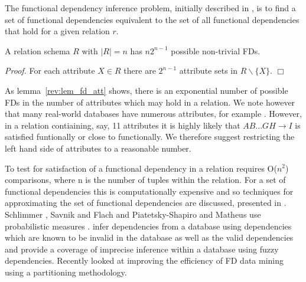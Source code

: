 The functional dependency inference problem,  initially described in
\cite{mr86}, is to find a set of functional dependencies equivalent to
the set of all functional dependencies that hold for a given relation
$r$.  

\begin{lemma}\label{rev:lem_fd_att}
\begin{rm}
A relation schema $R$ with $\mid R \mid = n$ has $n2^{n-1}$ possible
non-trivial FDs.
\end{rm}
\end{lemma}


{\em Proof.} For each attribute $X \in R$ there are $2^{n-1}$ attribute
sets in $R \backslash \{ X \}$. $\Box$

As lemma~\ref{rev:lem_fd_att} shows, there is an exponential number of
possible FDs in the number of attributes which may hold in a
relation. We note however that many real-world databases have numerous
attributes, for example \cite{bkm98}. However, in a relation
contiaining, say, 11 attributes it is highly likely that $AB \ldots GH
\to I$ is satisfied funtionally or close to functionally. We therefore
suggest restricting the left hand side of attributes to a reasonable number.

To test for satisfaction of a functional dependency in a
relation requires O($n^2$) comparisons, where n is the number of
tuples within the relation.  For a set of functional dependencies this
is computationally expensive and so techniques for approximating the
set of functional dependencies are discussed, presented in
\cite{mr94, km95, psm93, sf93,  schl93, she91}. Schlimmer \cite{schl93}, Savnik and Flach \cite{sf93} and Piatetsky-Shapiro and 
Matheus \cite{psm93} use probabilistic measures .  \cite{sf93} 
infer dependencies from a database using dependencies which are known to
be invalid in the database as well as the valid dependencies and \cite{HS95}
provide a coverage of imprecise inference within a database using fuzzy 
dependencies. Recently \cite{hkp98} looked at improving the efficiency
of FD data mining using a partitioning methodology.

\medskip

